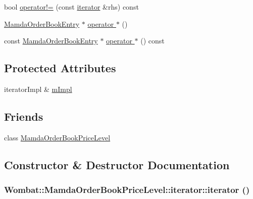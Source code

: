 \begin{CompactItemize}
\item 
bool \hyperlink{classWombat_1_1MamdaOrderBookPriceLevel_1_1iterator_fa1318e5e4c9473701cb88b6f63ff810}{operator!=} (const \hyperlink{classWombat_1_1MamdaOrderBookPriceLevel_1_1iterator}{iterator} \&rhs) const 
\item 
\hyperlink{classWombat_1_1MamdaOrderBookEntry}{Mamda\-Order\-Book\-Entry} $\ast$ \hyperlink{classWombat_1_1MamdaOrderBookPriceLevel_1_1iterator_e296e90ab5446a8c567c3d1f87a974bc}{operator $\ast$} ()
\item 
const \hyperlink{classWombat_1_1MamdaOrderBookEntry}{Mamda\-Order\-Book\-Entry} $\ast$ \hyperlink{classWombat_1_1MamdaOrderBookPriceLevel_1_1iterator_1e385f3351dfdec925b4f205280dc9e0}{operator $\ast$} () const 
\end{CompactItemize}
\subsection*{Protected Attributes}
\begin{CompactItemize}
\item 
iterator\-Impl \& \hyperlink{classWombat_1_1MamdaOrderBookPriceLevel_1_1iterator_612cc7a8597085dd45cd400c080ee3a4}{m\-Impl}
\end{CompactItemize}
\subsection*{Friends}
\begin{CompactItemize}
\item 
class \hyperlink{classWombat_1_1MamdaOrderBookPriceLevel_1_1iterator_83befa395a3c1e3740504a3c62bd8234}{Mamda\-Order\-Book\-Price\-Level}
\end{CompactItemize}


\subsection{Constructor \& Destructor Documentation}
\hypertarget{classWombat_1_1MamdaOrderBookPriceLevel_1_1iterator_29fc3f50791072bcc18c701dfb928648}{
\subsubsection[iterator]{\setlength{\rightskip}{0pt plus 5cm}Wombat::Mamda\-Order\-Book\-Price\-Level::iterator::iterator ()}}
\label{classWombat_1_1MamdaOrderBookPriceLevel_1_1iterator_29fc3f50791072bcc18c701dfb928648}


